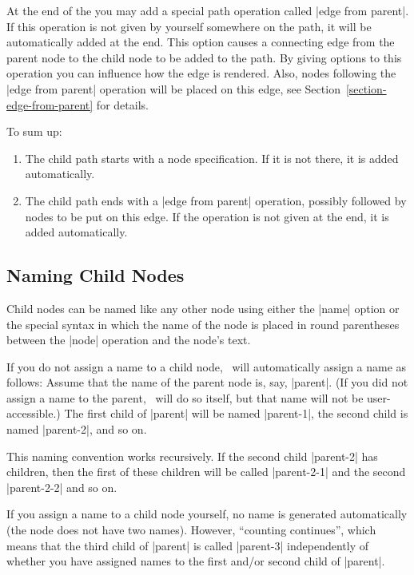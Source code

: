 At the end of the  you may add a special path operation called
|edge from parent|. If this operation is not given by yourself somewhere on the
path, it will be automatically added at the end. This option causes a
connecting edge from the parent node to the child node to be added to the path.
By giving options to this operation you can influence how the edge is rendered.
Also, nodes following the |edge from parent| operation will be placed on this
edge, see Section~\ref{section-edge-from-parent} for details.

To sum up:
%
\begin{enumerate}
    \item The child path starts with a node specification. If it is not there,
        it is added automatically.
    \item The child path ends with a |edge from parent| operation, possibly
        followed by nodes to be put on this edge. If the operation is not given
        at the end, it is added automatically.
\end{enumerate}


\subsection{Naming Child Nodes}

Child nodes can be named like any other node using either the |name| option or
the special syntax in which the name of the node is placed in round parentheses
between the |node| operation and the node's text.

If you do not assign a name to a child node, \tikzname\ will automatically
assign a name as follows: Assume that the name of the parent node is, say,
|parent|. (If you did not assign a name to the parent, \tikzname\ will do so
itself, but that name will not be user-accessible.) The first child of |parent|
will be named |parent-1|, the second child is named |parent-2|, and so on.

This naming convention works recursively. If the second child |parent-2| has
children, then the first of these children will be called |parent-2-1| and the
second |parent-2-2| and so on.

If you assign a name to a child node yourself, no name is generated
automatically (the node does not have two names). However, ``counting
continues'', which means that the third child of |parent| is called |parent-3|
independently of whether you have assigned names to the first and/or second
child of |parent|.

